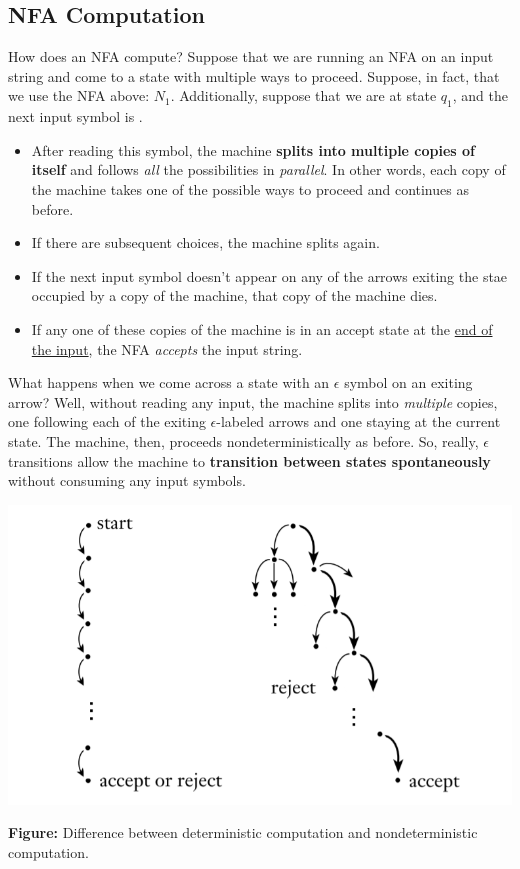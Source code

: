 \documentclass[letterpaper]{article}
\begin{document}
\subsection{NFA Computation}
How does an NFA compute? Suppose that we are running an NFA on an input string and come to a state with multiple ways to proceed. Suppose, in fact, that we use the NFA above: $N_1$. Additionally, suppose that we are at state $q_1$, and the next input symbol is . 
\begin{itemize}
    \item After reading this symbol, the machine \textbf{splits into multiple copies of itself} and follows \emph{all} the possibilities in \emph{parallel}. In other words, each copy of the machine takes one of the possible ways to proceed and continues as before. 
    \item If there are subsequent choices, the machine splits again. 
    \item If the next input symbol doesn't appear on any of the arrows exiting the stae occupied by a copy of the machine, that copy of the machine dies.
    \item If any one of these copies of the machine is in an accept state at the \underline{end of the input}, the NFA \emph{accepts} the input string.
\end{itemize}
What happens when we come across a state with an $\epsilon$ symbol on an exiting arrow? Well, without reading any input, the machine splits into \emph{multiple} copies, one following each of the exiting $\epsilon$-labeled arrows and one staying at the current state. The machine, then, proceeds nondeterministically as before. So, really, $\epsilon$ transitions allow the machine to \textbf{transition between states spontaneously} without consuming any input symbols.

\begin{center}
    \includegraphics[scale=0.4]{../assets/nfa_vs_dfa.png}

    \textbf{Figure:} Difference between deterministic computation and nondeterministic computation. 
\end{center}
\end{document}
